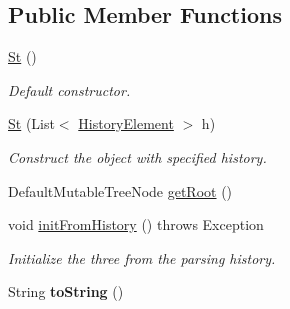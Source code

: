 \subsection*{Public Member Functions}
\begin{DoxyCompactItemize}
\item 
\hypertarget{classparser_program_1_1_st_aeb3f4be7d7e11f582302cb2a0c3339a6}{\hyperlink{classparser_program_1_1_st_aeb3f4be7d7e11f582302cb2a0c3339a6}{St} ()}\label{classparser_program_1_1_st_aeb3f4be7d7e11f582302cb2a0c3339a6}

\begin{DoxyCompactList}\small\item\em Default constructor. \end{DoxyCompactList}\item 
\hyperlink{classparser_program_1_1_st_a24290706e5844bd14027ac8600744963}{St} (List$<$ \hyperlink{classparser_program_1_1_history_element}{History\-Element} $>$ h)
\begin{DoxyCompactList}\small\item\em Construct the object with specified history. \end{DoxyCompactList}\item 
Default\-Mutable\-Tree\-Node \hyperlink{classparser_program_1_1_st_aae0a295da8eb563e9bb2aa3ba5beab08}{get\-Root} ()
\item 
void \hyperlink{classparser_program_1_1_st_afe794d3e531e9bd6c21dbb1f6398bcd0}{init\-From\-History} ()  throws Exception
\begin{DoxyCompactList}\small\item\em Initialize the three from the parsing history. \end{DoxyCompactList}\item 
\hypertarget{classparser_program_1_1_st_a57d9fda2fbb47bf1890205d4b9c663e6}{String {\bfseries to\-String} ()}\label{classparser_program_1_1_st_a57d9fda2fbb47bf1890205d4b9c663e6}

\end{DoxyCompactItemize}

